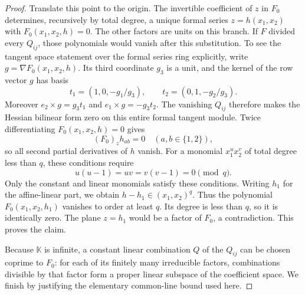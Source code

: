 \begin{proof}
Translate this point to the origin. The invertible coefficient of
$z$ in $F_0$ determines, recursively by total degree, a unique formal
series $z=h(x_1,x_2)$ with $F_0(x_1,x_2,h)=0$. The other factors
are units on this branch. If $F$ divided every $Q_{ij}$, those
polynomials would vanish after this substitution. To see the tangent
space statement over the formal series ring explicitly, write
$g=\nabla F_0(x_1,x_2,h)$. Its third coordinate $g_3$ is a unit,
and the kernel of the row vector $g$ has basis
\[
 t_1=(1,0,-g_1/g_3),\qquad t_2=(0,1,-g_2/g_3).
\]
Moreover $e_2\times g=g_3t_1$ and $e_1\times g=-g_3t_2$.
The vanishing $Q_{ij}$ therefore makes the Hessian bilinear form
zero on this entire formal tangent module. Twice differentiating
$F_0(x_1,x_2,h)=0$ gives
\[
 (F_0)_z h_{ab}=0\quad (a,b\in\{1,2\}),
\]
so all second partial derivatives of $h$ vanish. For a monomial
$x_1^u x_2^v$ of total degree less than $q$, these conditions require
\[
 u(u-1)=uv=v(v-1)=0\pmod q.
\]
Only the constant and linear monomials satisfy these conditions.
Writing $h_1$ for the affine-linear part, we obtain
$h-h_1\in(x_1,x_2)^q$. Thus the polynomial
$F_0(x_1,x_2,h_1)$ vanishes to order at least $q$. Its degree is
less than $q$, so it is identically zero. The plane $z=h_1$ would
be a factor of $F_0$, a contradiction. This proves the claim.

Because $\mathbb K$ is infinite, a constant linear combination $Q$
of the $Q_{ij}$ can be chosen coprime to $F_0$: for each of its
finitely many irreducible factors, combinations divisible by that
factor form a proper linear subspace of the coefficient space. We
finish by justifying the elementary common-line bound used here.


\end{proof}
